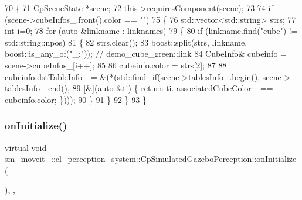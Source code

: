 \begin{DoxyCode}
70             \{
71                 CpSceneState *scene;
72                 this->\hyperlink{classsmacc_1_1ISmaccComponent_aa06d58b1dcec3c513ca2edddfd3847ec}{requiresComponent}(scene);
73 
74                 \textcolor{keywordflow}{if} (scene->cubeInfos\_.front().color == \textcolor{stringliteral}{""})
75                 \{
76                     std::vector<std::string> strs;
77                     \textcolor{keywordtype}{int} i=0;
78                     \textcolor{keywordflow}{for} (\textcolor{keyword}{auto} &linkname : linknames)
79                     \{
80                         \textcolor{keywordflow}{if} (linkname.find(\textcolor{stringliteral}{"cube"}) != std::string::npos)
81                         \{
82                             strs.clear();
83                             boost::split(strs, linkname, boost::is\_any\_of(\textcolor{stringliteral}{"\_:"})); \textcolor{comment}{// demo\_cube\_green::link}
84                             CubeInfo& cubeinfo = scene->cubeInfos\_[i++];
85 
86                             cubeinfo.color = strs[2];
87 
88                             cubeinfo.dstTableInfo\_ = &(*(std::find\_if(scene->tablesInfo\_.begin(), scene->
      tablesInfo\_.end(),
89                                                                       [&](\textcolor{keyword}{auto} &ti) \{ \textcolor{keywordflow}{return} ti.
      associatedCubeColor\_ == cubeinfo.color; \})));
90                         \}
91                     \}
92                 \}
93             \}
\end{DoxyCode}
\mbox{\label{classsm__moveit__4_1_1cl__perception__system_1_1CpSimulatedGazeboPerception_adebc30f6b1fc905f783de3f7bdf4a711}} 
\subsubsection{\texorpdfstring{on\+Initialize()}{onInitialize()}}
{\footnotesize\ttfamily virtual void sm\+\_\+moveit\+\_\+::cl\+\_\+perception\+\_\+system\+::\+Cp\+Simulated\+Gazebo\+Perception\+::on\+Initialize (\begin{DoxyParamCaption}{ }\end{DoxyParamCaption})\hspace{0.3cm}{\ttfamily [inline]}, {\ttfamily [override]}, {\ttfamily [virtual]}}




